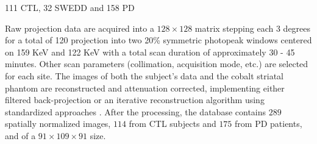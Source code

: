 111 \ac{CTL}, 32 \ac{SWEDD} and 158 \ac{PD}

Raw projection data are acquired into a $128 \times 128$ matrix stepping each 3 degrees for a total of 120 projection into two 20\% symmetric photopeak windows centered on 159 KeV and 122 KeV with a total scan duration of approximately 30 - 45 minutes. Other scan parameters (collimation, acquisition mode, etc.) are selected for each site. The images of both the subject's data and the cobalt striatal phantom are reconstructed and attenuation corrected, implementing either filtered back-projection or an iterative reconstruction algorithm using standardized approaches \cite{Inititative2010}. After the processing, the database contains $289$ spatially normalized images, $114$ from \ac{CTL} subjects and $175$ from \ac{PD} patients, and of a $91\times109\times91$ size. 